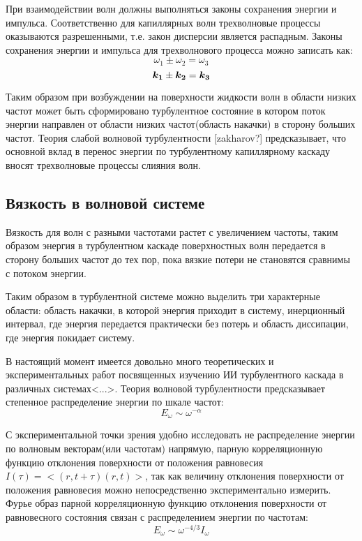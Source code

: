 При взаимодействии волн должны выполняться законы сохранения энергии и импульса. Соответственно для капиллярных волн трехволновые процессы оказываются разрешенными, т.е. закон дисперсии является распадным. Законы сохранения энергии и импульса для трехволнового процесса можно записать как:
\begin{equation}
 \label{eq:saveOmega}
\omega_1 \pm \omega_2 = \omega_3
\end{equation}
\begin{equation}
 \label{eq:saveK}
\mbox{\boldmath$k_1$} \pm \mbox{\boldmath$k_2$} = \mbox{\boldmath$k_3$}
\end{equation}

Таким образом при возбуждении на поверхности жидкости волн в области низких частот может быть сформировано турбулентное состояние в котором поток энергии направлен от области низких частот(область накачки) в сторону больших частот. Теория слабой волновой турбулентности [zakharov?] предсказывает, что основной вклад в перенос энергии по турбулентному капиллярному каскаду вносят трехволновые процессы слияния волн. 

\subsection{Вязкость в волновой системе} \label{subsect1_1_3}
Вязкость для волн с разными частотами растет с увеличением частоты, таким образом энергия в турбулентном каскаде поверхностных волн передается в сторону больших частот до тех пор, пока вязкие потери не становятся сравнимы с потоком энергии.

Таким образом в турбулентной системе можно выделить три характерные области: область накачки, в которой энергия приходит в систему, инерционный интервал, где энергия передается практически без потерь и область диссипации, где энергия покидает систему. 

В настоящий момент имеется довольно много теоретических и экспериментальных работ посвященных изучению ИИ турбулентного каскада в различных системах<...>. Теория волновой турбулентности предсказывает степенное распределение энергии по шкале частот:
\begin{equation}
E_\omega \sim \omega^{-\alpha}
\end{equation}

С экспериментальной точки зрения удобно исследовать не распределение энергии по волновым векторам(или частотам) напрямую, парную корреляционную функцию отклонения поверхности от положения равновесия $I(\tau)=<(r, t+\tau)(r,t)>$, так как величину отклонения поверхности от положения равновесия можно непосредственно экспериментально измерить. Фурье образ парной корреляционную функцию отклонения поверхности от равновесного состояния связан с распределением энергии по частотам:
\begin{equation}
E_\omega \sim \omega^{-4/3}I_\omega
\end{equation}

